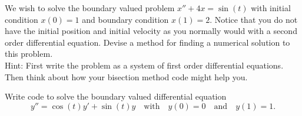 \begin{problem}
    We wish to solve the boundary valued problem $x'' + 4x = \sin(t)$ with initial
    condition $x(0)=1$ and boundary condition $x(1)=2$.  Notice that you do not have the
    initial position and initial velocity as you normally would with a second order
    differential equation.  Devise a method for finding a numerical solution to this
    problem. \\
    Hint: First write the problem as a system of first order differential equations.  Then
    think about how your bisection method code might help you.
\end{problem}


\begin{problem}
    Write code to solve the boundary valued differential equation
    \[ y'' = \cos(t) y' + \sin(t) y \quad \text{with} \quad y(0) = 0 \quad \text{and}
        \quad y(1) = 1. \]
\end{problem}


